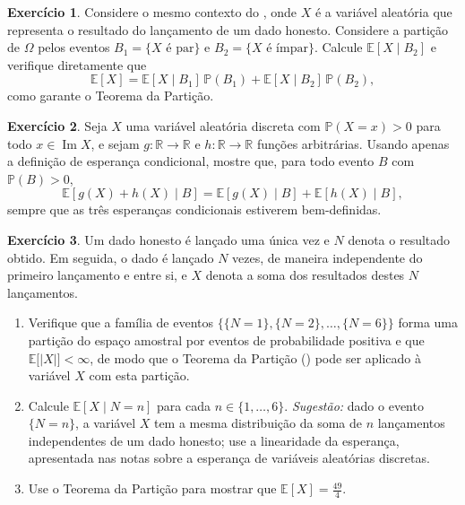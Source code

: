 \documentclass[12pt,portuguese]{article}
\theoremstyle{definition}
\newtheorem{exercise}{Exercício}
\begin{document}
\begin{exercise}\label{exercise:dado-particao}
Considere o mesmo contexto do , onde \(X\) é a variável
aleatória que representa o resultado do lançamento de um dado honesto. 
Considere a partição de \(\Omega\) pelos
eventos \(B_1 = \{X \text{ é par}\}\) e \(B_2 = \{X \text{ é ímpar}\}\).
Calcule \(\mathbb{E}[X \mid B_2]\) e verifique diretamente que
\[
\mathbb{E}[X] = \mathbb{E}[X \mid B_1] \, \mathbb{P}(B_1)
+ \mathbb{E}[X \mid B_2] \, \mathbb{P}(B_2),
\]
como garante o Teorema da Partição.
\end{exercise}

\begin{exercise}\label{exercise:soma-de-probabilidades}
Seja \(X\) uma variável aleatória discreta com \(\mathbb{P}(X = x) > 0\)
para todo \(x \in \operatorname{Im} X\), e sejam \(g : \mathbb{R} \to
\mathbb{R}\) e \(h : \mathbb{R} \to \mathbb{R}\) funções arbitrárias.
Usando apenas a definição de esperança condicional, mostre que, para todo
evento \(B\) com \(\mathbb{P}(B) > 0\),
\[
\mathbb{E}[g(X) + h(X) \mid B]
= \mathbb{E}[g(X) \mid B] + \mathbb{E}[h(X) \mid B],
\]
sempre que as três esperanças condicionais estiverem bem-definidas.
\end{exercise}


\begin{exercise}\label{exercise:soma-lancamentos-aleatoria}
Um dado honesto é lançado uma única vez e \(N\) denota o resultado obtido.
Em seguida, o dado é lançado \(N\) vezes, de maneira independente do primeiro
lançamento e entre si, e \(X\) denota a soma dos resultados destes \(N\)
lançamentos.
\begin{enumerate}[label=(\alph*)]
  \item Verifique que a família de eventos
        $\bigl\{ \{N = 1\}, \{N = 2\},\ldots,\{N = 6\} \bigr\}$ forma uma partição do espaço
        amostral por eventos de probabilidade positiva e que
        \(\mathbb{E}\bigl[|X|\bigr] < \infty\), de modo que o Teorema da
        Partição () pode ser aplicado à
        variável \(X\) com esta partição.
  \item Calcule \(\mathbb{E}[X \mid N = n]\) para cada
        \(n \in \{1, \ldots, 6\}\). \emph{Sugestão:} dado o evento
        \(\{N = n\}\), a variável \(X\) tem a mesma distribuição da soma de
        \(n\) lançamentos independentes de um dado honesto; use a
        linearidade da esperança, apresentada nas notas sobre a esperança
        de variáveis aleatórias discretas.
  \item Use o Teorema da Partição para mostrar que
        \(\mathbb{E}[X] = \frac{49}{4}\).
\end{enumerate}
\end{exercise}
\end{document}
